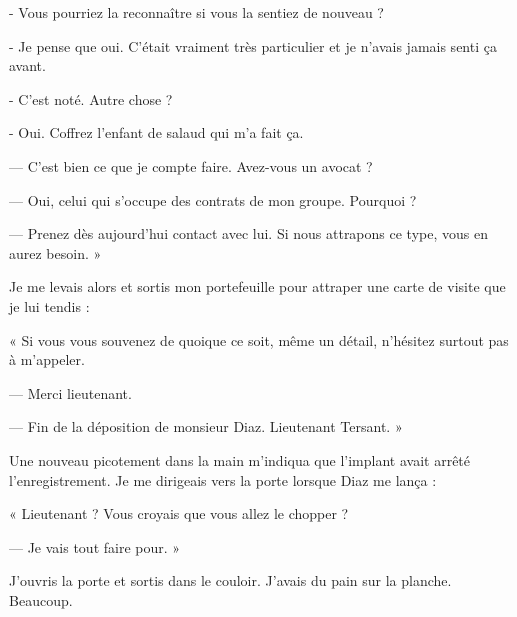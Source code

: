 - Vous pourriez la reconnaître si vous la sentiez de nouveau ?

- Je pense que oui. C'était vraiment très particulier et je n'avais jamais senti ça avant.

- C'est noté. Autre chose ?

- Oui. Coffrez l'enfant de salaud qui m'a fait ça.

— C'est bien ce que je compte faire. Avez-vous un avocat ?

— Oui, celui qui s'occupe des contrats de mon groupe. Pourquoi ?

— Prenez dès aujourd'hui contact avec lui. Si nous attrapons ce type, vous en aurez besoin. »

Je me levais alors et sortis mon portefeuille pour attraper une carte de visite que je lui tendis :

« Si vous vous souvenez de quoique ce soit, même un détail, n'hésitez surtout pas à m'appeler.

— Merci lieutenant.

— Fin de la déposition de monsieur Diaz. Lieutenant Tersant. »

Une nouveau picotement dans la main m'indiqua que l'implant avait arrêté l'enregistrement. Je me dirigeais vers la
porte lorsque Diaz me lança :

« Lieutenant ? Vous croyais que vous allez le chopper ?

— Je vais tout faire pour. »

J'ouvris la porte et sortis dans le couloir. J'avais du pain sur la planche. Beaucoup.
